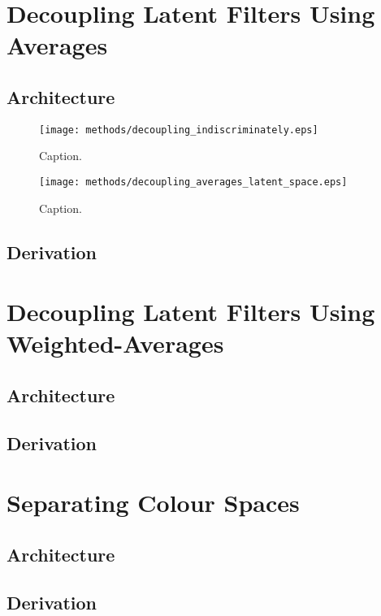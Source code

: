 %
%
%
%
%
\section{Decoupling Latent Filters Using Averages}
\lipsum[2]
\subsection{Architecture}
\begin{figure}[H]
\centering
\captionsetup{justification=centering}
\texttt{[image: methods/decoupling\_indiscriminately.eps]}
\caption{Caption.}
\label{fig:decoupling_indiscriminately}
\end{figure}

\begin{figure}[H]
\centering
\captionsetup{justification=centering}
\texttt{[image: methods/decoupling\_averages\_latent\_space.eps]}
\caption{Caption.}
\label{fig:decoupling_averages_latent_space}
\end{figure}

\subsection{Derivation}

%
%
%
%
%
\section{Decoupling Latent Filters Using Weighted-Averages}
\lipsum[2]
\subsection{Architecture}
\subsection{Derivation}

%
%
%
%
%
\section{Separating Colour Spaces}
\lipsum[2]
\subsection{Architecture}
\subsection{Derivation}

%
%
%
%
%
